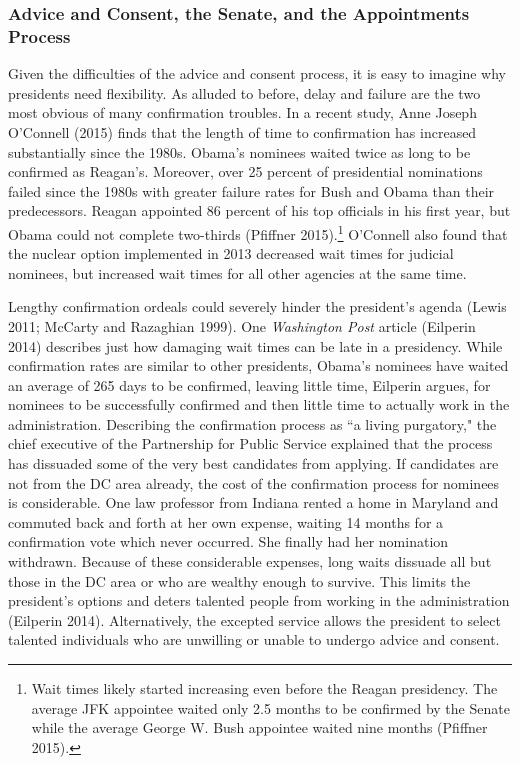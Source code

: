 \documentclass[12pt]{article}
\begin{document}
\subsubsection*{Advice and Consent, the Senate, and the Appointments Process}

Given the difficulties of the advice and consent process, it is easy to imagine why presidents need flexibility. As alluded to before, delay and failure are the two most obvious of many confirmation troubles. In a recent study, Anne Joseph O'Connell (2015) finds that the length of time to confirmation has increased substantially since the 1980s. Obama's nominees waited twice as long to be confirmed as Reagan's. Moreover, over 25 percent of presidential nominations failed since the 1980s with greater failure rates for Bush and Obama than their predecessors. Reagan appointed 86 percent of his top officials in his first year, but Obama could not complete two-thirds (Pfiffner 2015).\footnote{Wait times likely started increasing even before the Reagan presidency. The average JFK appointee waited only 2.5 months to be confirmed by the Senate while the average George W. Bush appointee waited nine months (Pfiffner 2015).} O'Connell also found that the nuclear option implemented in 2013 decreased wait times for judicial nominees, but increased wait times for all other agencies at the same time.

Lengthy confirmation ordeals could severely hinder the president's agenda (Lewis 2011; McCarty and Razaghian 1999). One \textit{Washington Post} article (Eilperin 2014) describes just how damaging wait times can be late in a presidency. While confirmation rates are similar to other presidents, Obama's nominees have waited an average of 265 days to be confirmed, leaving little time, Eilperin argues, for nominees to be successfully confirmed and then little time to actually work in the administration. Describing the confirmation process as ``a living purgatory," the chief executive of the Partnership for Public Service explained that the process has dissuaded some of the very best candidates from applying. If candidates are not from the DC area already, the cost of the confirmation process for nominees is considerable. One law professor from Indiana rented a home in Maryland and commuted back and forth at her own expense, waiting 14 months for a confirmation vote which never occurred. She finally had her nomination withdrawn. Because of these considerable expenses, long waits dissuade all but those in the DC area or who are wealthy enough to survive. This limits the president's options and deters talented people from working in the administration (Eilperin 2014). Alternatively, the excepted service allows the president to select talented individuals who are unwilling or unable to undergo advice and consent. 
\end{document}
